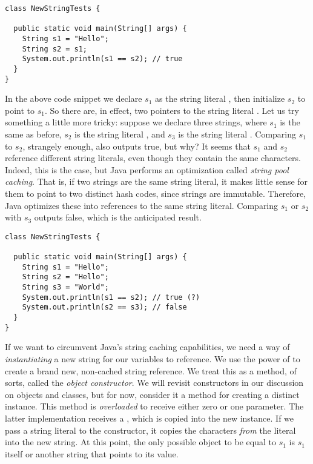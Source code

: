 \begin{cl}[]{}
\begin{lstlisting}[language=MyJava]
class NewStringTests {

  public static void main(String[] args) {
    String s1 = "Hello";
    String s2 = s1;
    System.out.println(s1 == s2); // true
  }
}
\end{lstlisting}
\end{cl}

In the above code snippet we declare $s_1$ as the string literal , then initialize $s_2$ to point to $s_1$. So there are, in effect, two pointers to the string literal . Let us try something a little more tricky: suppose we declare three strings, where $s_1$ is the same as before, $s_2$ is the string literal , and $s_3$ is the string literal . Comparing $s_1$ to $s_2$, strangely enough, also outputs true, but why? It seems that $s_1$ and $s_2$ reference different string literals, even though they contain the same characters. Indeed, this is the case, but Java performs an optimization called \textit{string pool caching}. That is, if two strings are the same string literal, it makes little sense for them to point to two distinct hash codes, since strings are immutable. Therefore, Java optimizes these into references to the same string literal. Comparing $s_1$ or $s_2$ with $s_3$ outputs false, which is the anticipated result.

\begin{cl}[]{}
\begin{lstlisting}[language=MyJava]
class NewStringTests {

  public static void main(String[] args) {
    String s1 = "Hello";
    String s2 = "Hello";
    String s3 = "World";
    System.out.println(s1 == s2); // true (?)
    System.out.println(s2 == s3); // false
  }
}
\end{lstlisting}
\end{cl}

If we want to circumvent Java's string caching capabilities, we need a way of \textit{instantiating} a new string for our variables to reference. We use the power of  to create a brand new, non-cached string reference. We treat this as a method, of sorts, called the \textit{object constructor}. We will revisit constructors in our discussion on objects and classes, but for now, consider it a method for creating a distinct  instance. This method is \textit{overloaded} to receive either zero or one parameter. The latter implementation receives a , which is copied into the new  instance. If we pass a string literal to the constructor, it copies the characters \textit{from} the literal into the new string. At this point, the only possible object to be equal to $s_1$ is $s_1$ itself or another string that points to its value.

